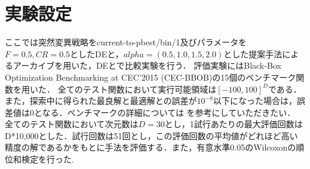 \documentclass[a4paper,11pt,oneside,openany]{jsbook}
\begin{document}
\section{実験設定}
ここでは突然変異戦略をcurrent-to-pbest/bin/1及びパラメータを$F=0.5, CR=0.5$としたDEと，$alpha = (0.5, 1.0, 1.5, 2.0)$とした提案手法によるアーカイブを用いた，DEとで比較実験を行う．
評価実験にはBlack-Box Optimization Benchmarking at CEC'2015 (CEC-BBOB)の15個のベンチマーク関数を用いた．
全てのテスト関数において実行可能領域は$[-100,100]^D$である．また，探索中に得られた最良解と最適解との誤差が$10^{-8}$以下になった場合は，誤差値は0となる．ベンチマークの詳細については \cite{CEC2015} を参考にしていただきたい．
全てのテスト関数において次元数は$D=30$とし，1試行あたりの最大評価回数はD*10,000とした．試行回数は51回とし，この評価回数の平均値がどれほど高い精度の解であるかをもとに手法を評価する．また，有意水準0.05のWilcoxonの順位和検定を行った.
\end{document}

